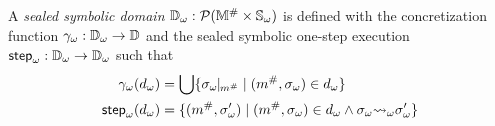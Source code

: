 \begin{definition}\label{def:symbdom}
  A \textit{sealed symbolic domain} ${\mathbb{D}}_\omega: \mathcal{P}({\mathbb{M}}^{\#} \times
  {\mathbb{S}}_\omega)$ is defined with the concretization function
  ${\gamma}_\omega: {\mathbb{D}}_\omega \rightarrow \mathbb{D}$ and the sealed symbolic one-step execution
  ${\textsf{step}}_\omega: {\mathbb{D}}_\omega \rightarrow {\mathbb{D}}_\omega$ such that
  \begin{align}
    {\gamma}_\omega({d}_\omega) &=
    \bigcup \{ {\sigma}_\omega\!\!\mid\!\!_{{m}^{\#}} \mid ({m}^{\#}, {\sigma}_\omega) \in
    {d}_\omega\}\\
    {\textsf{step}}_\omega({d}_\omega) &= \{ ({m}^{\#}, {\sigma}_\omega') \mid ({m}^{\#}, {\sigma}_\omega)
    \in {d}_\omega \wedge {\sigma}_\omega {\leadsto}_\omega {\sigma}_\omega' \}
  \end{align}
\end{definition}
